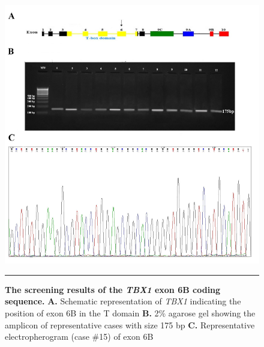 \begin{refsection}
\begin{figure}[!thbp]
\centering
\includegraphics[width=\linewidth]{Figures/Figure4_8TBX6B.pdf}
\rule{35em}{0.5pt}
\caption{\textbf{The screening results of the \textit{TBX1} exon 6B coding sequence.}
\textbf{A.} Schematic representation of \textit{TBX1} indicating the position of exon 6B in the T domain \textbf{B.} 2\% agarose gel showing the amplicon of representative cases with size 175 bp \textbf{C.} Representative electropherogram (case \#15) of exon 6B}
\label{fig:4_8}
\end{figure}


\end{refsection}
